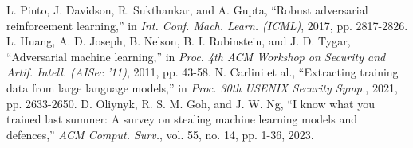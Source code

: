  L. Pinto, J. Davidson, R. Sukthankar, and A. Gupta, ``Robust adversarial reinforcement learning,'' in \textit{Int. Conf. Mach. Learn. (ICML)}, 2017, pp. 2817-2826.
 L. Huang, A. D. Joseph, B. Nelson, B. I. Rubinstein, and J. D. Tygar, ``Adversarial machine learning,'' in \textit{Proc. 4th ACM Workshop on Security and Artif. Intell. (AISec '11)}, 2011, pp. 43-58.
 N. Carlini et al., ``Extracting training data from large language models,'' in \textit{Proc. 30th USENIX Security Symp.}, 2021, pp. 2633-2650.
 D. Oliynyk, R. S. M. Goh, and J. W. Ng, ``I know what you trained last summer: A survey on stealing machine learning models and defences,'' \textit{ACM Comput. Surv.}, vol. 55, no. 14, pp. 1-36, 2023.